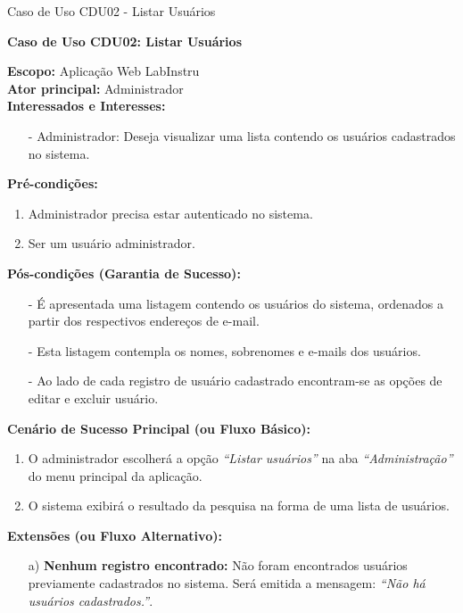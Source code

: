 \begin{quadro}[H]
	\centering
	\caption{Caso de Uso CDU02 - Listar Usuários}

	\begin{framed}

		\textbf{Caso de Uso CDU02: Listar Usuários}\\
		\begin{flushleft}
		\textbf{Escopo:} Aplicação Web LabInstru\\
		\textbf{Ator principal:} Administrador\\
		\textbf{Interessados e Interesses:}
		\begin{itemize}
			\item[-] Administrador: Deseja visualizar uma lista contendo os usuários cadastrados no sistema.
		\end{itemize}
		\textbf{Pré-condições:}\\
			 \begin{enumerate}
			 	\item{Administrador precisa estar autenticado no sistema.}
			 	\item{Ser um usuário administrador.}
			 \end{enumerate}
		\textbf{Pós-condições (Garantia de Sucesso):}
		\begin{itemize}
			\item[-] É apresentada uma listagem contendo os usuários do sistema, ordenados a partir dos respectivos endereços de e-mail.
			\item[-] Esta listagem contempla os nomes, sobrenomes e e-mails dos usuários.
			\item[-] Ao lado de cada registro de usuário cadastrado encontram-se as opções de editar e excluir usuário.
		\end{itemize}
		\textbf{Cenário de Sucesso Principal (ou Fluxo Básico):}\\
			\begin{enumerate}
			 	\item{O administrador escolherá a opção \textit{``Listar usuários''} na aba \textit{``Administração''} do menu principal da aplicação.}
			 	\item{O sistema exibirá o resultado da pesquisa na forma de uma lista de usuários.}
			 \end{enumerate}

		\textbf{Extensões (ou Fluxo Alternativo):}
		\begin{itemize}
			\item[a)] \textbf{Nenhum registro encontrado:} Não foram encontrados  usuários previamente cadastrados no sistema. Será emitida a mensagem: \textit{``Não há usuários cadastrados.''}.
		\end{itemize}

		\end{flushleft}

	\end{framed}

\end {quadro} %

